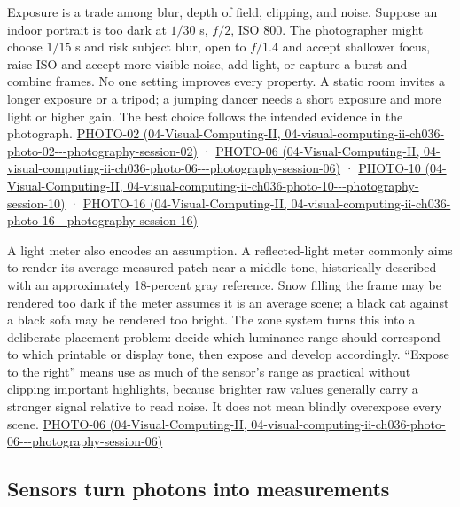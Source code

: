 Exposure is a trade among blur, depth of field, clipping, and noise. Suppose an indoor portrait is too dark at \(1/30\) s, \(f/2\), ISO 800. The photographer might choose \(1/15\) s and risk subject blur, open to \(f/1.4\) and accept shallower focus, raise ISO and accept more visible noise, add light, or capture a burst and combine frames. No one setting improves every property. A static room invites a longer exposure or a tripod; a jumping dancer needs a short exposure and more light or higher gain. The best choice follows the intended evidence in the photograph. \href{../04-Visual-Computing-II/main.pdf\#nameddest=04-visual-computing-ii-ch036-photo-02---photography-session-02}{PHOTO-02 (04-Visual-Computing-II, 04-visual-computing-ii-ch036-photo-02-\/-\/-photography-session-02)} · \href{../04-Visual-Computing-II/main.pdf\#nameddest=04-visual-computing-ii-ch036-photo-06---photography-session-06}{PHOTO-06 (04-Visual-Computing-II, 04-visual-computing-ii-ch036-photo-06-\/-\/-photography-session-06)} · \href{../04-Visual-Computing-II/main.pdf\#nameddest=04-visual-computing-ii-ch036-photo-10---photography-session-10}{PHOTO-10 (04-Visual-Computing-II, 04-visual-computing-ii-ch036-photo-10-\/-\/-photography-session-10)} · \href{../04-Visual-Computing-II/main.pdf\#nameddest=04-visual-computing-ii-ch036-photo-16---photography-session-16}{PHOTO-16 (04-Visual-Computing-II, 04-visual-computing-ii-ch036-photo-16-\/-\/-photography-session-16)}

A light meter also encodes an assumption. A reflected-light meter commonly aims to render its average measured patch near a middle tone, historically described with an approximately 18-percent gray reference. Snow filling the frame may be rendered too dark if the meter assumes it is an average scene; a black cat against a black sofa may be rendered too bright. The zone system turns this into a deliberate placement problem: decide which luminance range should correspond to which printable or display tone, then expose and develop accordingly. ``Expose to the right'' means use as much of the sensor's range as practical without clipping important highlights, because brighter raw values generally carry a stronger signal relative to read noise. It does not mean blindly overexpose every scene. \href{../04-Visual-Computing-II/main.pdf\#nameddest=04-visual-computing-ii-ch036-photo-06---photography-session-06}{PHOTO-06 (04-Visual-Computing-II, 04-visual-computing-ii-ch036-photo-06-\/-\/-photography-session-06)}

\subsection{Sensors turn photons into measurements}\label{03-visual-computing-i-ch003-sensors-turn-photons-into-measurements}

